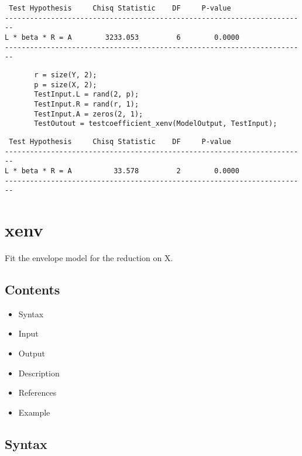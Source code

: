 \documentclass[a4paper,11pt,openany]{memoir}
\begin{document}
        \color{lightgray}\ttfamily \begin{verbatim}
 Test Hypothesis     Chisq Statistic    DF     P-value
------------------------------------------------------------------------
L * beta * R = A        3233.053         6        0.0000
------------------------------------------------------------------------
\end{verbatim} \rmfamily
\color{black}
\begin{verbatim}
       r = size(Y, 2);
       p = size(X, 2);
       TestInput.L = rand(2, p);
       TestInput.R = rand(r, 1);
       TestInput.A = zeros(2, 1);
       TestOutout = testcoefficient_xenv(ModelOutput, TestInput);\end{verbatim}
        \color{lightgray}\ttfamily \begin{verbatim}
 Test Hypothesis     Chisq Statistic    DF     P-value
------------------------------------------------------------------------
L * beta * R = A          33.578         2        0.0000
------------------------------------------------------------------------
\end{verbatim} \rmfamily
\color{black}
    
    
\newpage
    
\rmfamily
\color{black}\section{xenv}

\begin{par}
Fit the envelope model for the reduction on X.
\end{par} \vspace{1em}

\subsection*{Contents}

\begin{itemize}
\setlength{\itemsep}{-1ex}
   \item Syntax
   \item Input
   \item Output
   \item Description
   \item References
   \item Example
\end{itemize}


\subsection*{Syntax}
\end{document}
